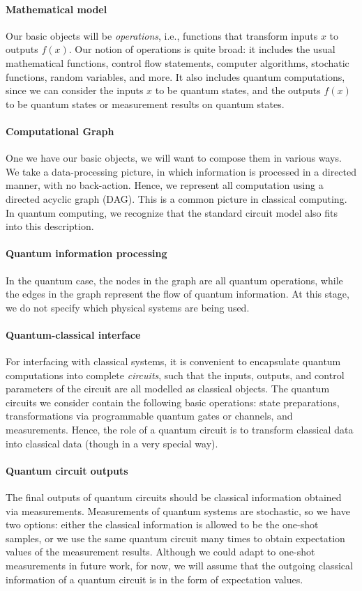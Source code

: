\documentclass[a4paper,10pt]{article}
\begin{document}
\paragraph{Mathematical model}
Our basic objects will be \emph{operations}, i.e., functions that transform inputs $x$ to outputs $f(x)$. Our notion of operations is quite broad: it includes the usual mathematical functions, control flow statements, computer algorithms, stochatic functions, random variables, and more. It also includes quantum computations, since we can consider the inputs $x$ to be quantum states, and the outputs $f(x)$ to be quantum states or measurement results on quantum states. 

\paragraph{Computational Graph}
One we have our basic objects, we will want to compose them in various ways. We take a data-processing picture, in which information is processed in a directed manner, with no back-action. Hence, we represent all computation using a directed acyclic graph (DAG). This is a common picture in classical computing. In quantum computing, we recognize that the standard circuit model also fits into this description. 

\paragraph{Quantum information processing}
In the quantum case, the nodes in the graph are all quantum operations, while the edges in the graph represent the flow of quantum information. At this stage, we do not specify which physical systems are being used. 

\paragraph{Quantum-classical interface}
For interfacing with classical systems, it is convenient to encapsulate quantum computations into complete \emph{circuits}, such that the inputs, outputs, and control parameters of the circuit are all modelled as classical objects. The quantum circuits we consider contain the following basic operations: state preparations, transformations via programmable quantum gates or channels, and measurements. Hence, the role of a quantum circuit is to transform classical data into classical data (though in a very special way).

\paragraph{Quantum circuit outputs}
The final outputs of quantum circuits should be classical information obtained via measurements. Measurements of quantum systems are stochastic, so we have two options: either the classical information is allowed to be the one-shot samples, or we use the same quantum circuit many times to obtain expectation values of the measurement results. Although we could adapt to one-shot measurements in future work, for now, we will assume that the outgoing classical information of a quantum circuit is in the form of expectation values. 
\end{document}

